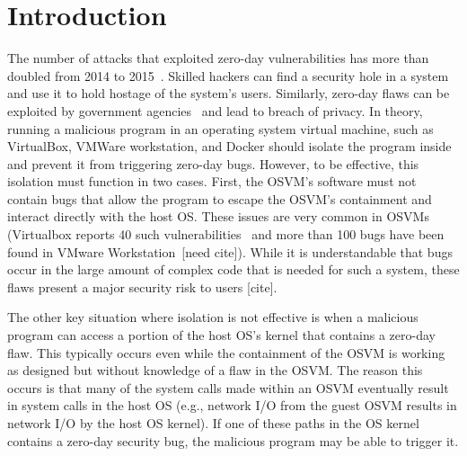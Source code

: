 \section{Introduction}
\label{sec.introduction}

%
The number of attacks that exploited zero-day vulnerabilities has more than 
doubled from 2014 to 2015~\cite{zero-day}. Skilled hackers can find a security 
hole in a system and use it to hold hostage of the system's users. Similarly, zero-day 
flaws can be exploited by government agencies~\cite{fbi-ff, fbi-iphone} and
lead to breach of privacy.
%
In theory, running a malicious program in an operating system virtual 
machine, such as VirtualBox, VMWare workstation, and Docker should isolate the
program inside and prevent it from triggering zero-day bugs.  However, to be 
effective, this isolation must function in two cases.  First, the OSVM's 
software must not contain bugs that allow the program to escape the 
OSVM's containment and interact directly with the host OS.  These
issues are very common in OSVMs (Virtualbox reports 40 such 
vulnerabilities~\cite{Virtualbox-Vulnerabilities} and more than 100 bugs have 
been found in VMware Workstation~[need cite]).  While it is understandable that
bugs occur in the large amount of complex code that is needed for such a 
system, these flaws present a major security risk to users [cite].


The other key situation where isolation is not effective is when a malicious 
program  can access a portion of the host OS's kernel that contains a 
zero-day flaw.  This typically occurs even while the containment of the OSVM is 
working as designed but without knowledge of a flaw in the OSVM.  The reason
this occurs is that many of the system calls made within an OSVM eventually 
result in system calls in the host OS (e.g., network I/O from the guest
OSVM results in network I/O by the host OS kernel).  If one of these paths in
the OS kernel contains a zero-day security bug, the malicious program
may be able to trigger it.

